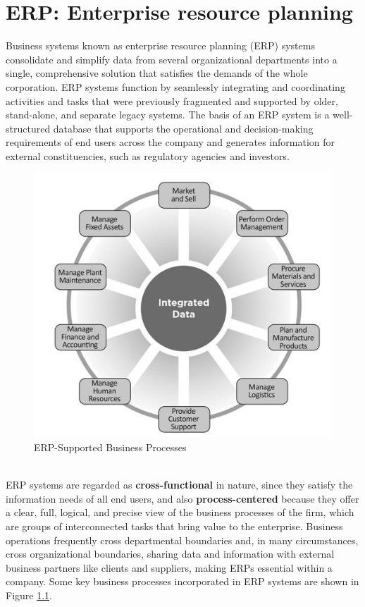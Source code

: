 \chapter{ERP: Enterprise resource planning}
Business systems known as enterprise resource planning (ERP) systems consolidate and simplify data from several organizational departments into a single, comprehensive solution that satisfies the demands of the whole corporation. ERP systems function by seamlessly integrating and coordinating activities and tasks that were previously fragmented and supported by older, stand-alone, and separate legacy systems.
The basis of an ERP system is a well-structured database that supports the operational and decision-making requirements of end users across the company and generates information for external constituencies, such as regulatory agencies and investors.
\begin{figure}\centering
    \includegraphics[scale=0.5]{Pictures/2_ERP_Processes.jpg}
    \caption{ERP-Supported Business Processes}
    \label{fig:2_ERP_Processes}
\end{figure}
\\
ERP systems are regarded as \textbf{cross-functional} in nature, since they satisfy the information needs of all end users, and also \textbf{process-centered} because they offer a clear, full, logical, and precise view of the business processes of the firm, which are groups of interconnected tasks that bring value to the enterprise.
Business operations frequently cross departmental boundaries and, in many circumstances, cross organizational boundaries, sharing data and information with external business partners like clients and suppliers, making ERPs essential within a company.
Some key business processes incorporated in ERP systems are shown in Figure \ref{fig:2_ERP_Processes}.


